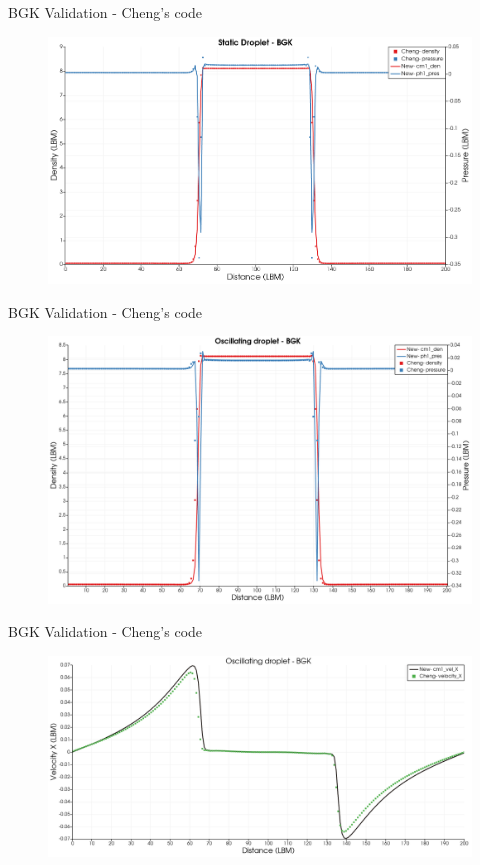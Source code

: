 \documentclass{beamer}
\begin{document}
	\begin{frame}{BGK Validation - Cheng's code}
		\begin{figure}
			\centering
			\includegraphics[scale=0.3]{pics/BGK_StaticDroplet.png}
		\end{figure}
	\end{frame}
	\begin{frame}{BGK Validation - Cheng's code}
		\begin{figure}
			\centering
			\includegraphics[scale=0.3]{pics/BGK_OscDroplet_PRHO.png}
		\end{figure}
	\end{frame}
	\begin{frame}{BGK Validation - Cheng's code}
		\begin{figure}
			\centering
			\includegraphics[scale=0.3]{pics/BGK_OscDroplet_VelProf.png}
		\end{figure}
	\end{frame}
\end{document}
